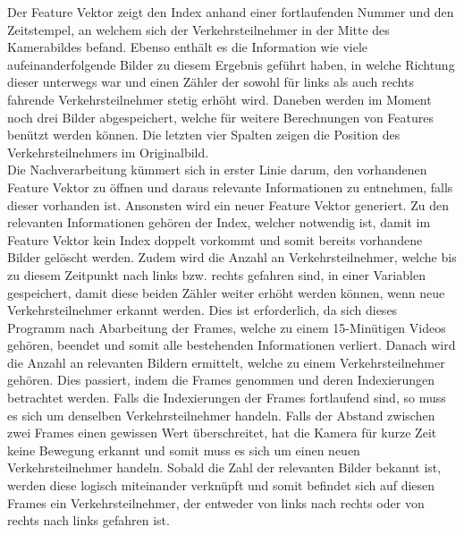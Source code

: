 \setlength\tabcolsep{0pt}

Der Feature Vektor zeigt den Index anhand einer fortlaufenden Nummer und den Zeitstempel, an welchem sich der Verkehrsteilnehmer in der Mitte des Kamerabildes befand. Ebenso enthält es die Information wie viele aufeinanderfolgende Bilder zu diesem Ergebnis geführt haben, in welche Richtung dieser unterwegs war und einen Zähler der sowohl für links als auch rechts fahrende Verkehrsteilnehmer stetig erhöht wird. Daneben werden im Moment noch drei Bilder abgespeichert, welche für weitere Berechnungen von Features benützt werden können. Die letzten vier Spalten zeigen die Position des Verkehrsteilnehmers im Originalbild.\\
Die Nachverarbeitung kümmert sich in erster Linie darum, den vorhandenen Feature Vektor zu öffnen und daraus relevante Informationen zu entnehmen, falls dieser vorhanden ist. Ansonsten wird ein neuer Feature Vektor generiert. Zu den relevanten Informationen gehören der Index, welcher notwendig ist, damit im Feature Vektor kein Index doppelt vorkommt und somit bereits vorhandene Bilder gelöscht werden. Zudem wird die Anzahl an Verkehrsteilnehmer, welche bis zu diesem Zeitpunkt nach links bzw. rechts gefahren sind, in einer Variablen gespeichert, damit diese beiden Zähler weiter erhöht werden können, wenn neue Verkehrsteilnehmer erkannt werden. Dies ist erforderlich, da sich dieses Programm nach Abarbeitung der Frames, welche zu einem 15-Minütigen Videos gehören, beendet und somit alle bestehenden Informationen verliert. Danach wird die Anzahl an relevanten Bildern ermittelt, welche zu einem Verkehrsteilnehmer gehören. Dies passiert, indem die Frames genommen und deren Indexierungen betrachtet werden. Falls die Indexierungen der Frames fortlaufend sind, so muss es sich um denselben Verkehrsteilnehmer handeln. Falls der Abstand zwischen zwei Frames einen gewissen Wert überschreitet, hat die Kamera für kurze Zeit keine Bewegung erkannt und somit muss es sich um einen neuen Verkehrsteilnehmer handeln. Sobald die Zahl der relevanten Bilder bekannt ist, werden diese logisch miteinander verknüpft und somit befindet sich auf diesen Frames ein Verkehrsteilnehmer, der entweder von links nach rechts oder von rechts nach links gefahren ist.\\
